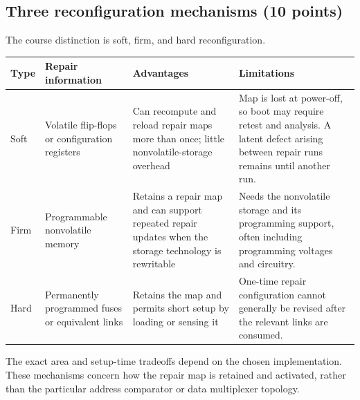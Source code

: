 \subsection{Three reconfiguration mechanisms (10 points)}
\answer The course distinction is soft, firm, and hard reconfiguration.
\begin{center}\small
\begin{tabular}{>{\raggedright\arraybackslash}p{18mm}>{\raggedright\arraybackslash}p{40mm}>{\raggedright\arraybackslash}p{40mm}>{\raggedright\arraybackslash}p{42mm}}
\toprule Type&Repair information&Advantages&Limitations\\\midrule
Soft&Volatile flip-flops or configuration registers&Can recompute and reload repair maps more than once; little nonvolatile-storage overhead&Map is lost at power-off, so boot may require retest and analysis. A latent defect arising between repair runs remains until another run.\\[1mm]
Firm&Programmable nonvolatile memory&Retains a repair map and can support repeated repair updates when the storage technology is rewritable&Needs the nonvolatile storage and its programming support, often including programming voltages and circuitry.\\[1mm]
Hard&Permanently programmed fuses or equivalent links&Retains the map and permits short setup by loading or sensing it&One-time repair configuration cannot generally be revised after the relevant links are consumed.\\
\bottomrule
\end{tabular}\end{center}
The exact area and setup-time tradeoffs depend on the chosen implementation. These mechanisms concern how the repair map is retained and activated, rather than the particular address comparator or data multiplexer topology.

